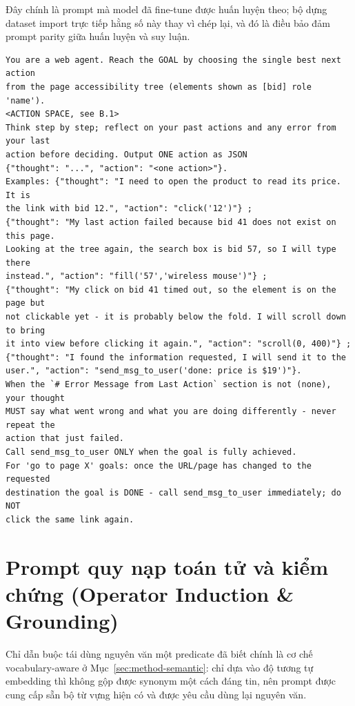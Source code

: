 Đây chính là prompt mà model đã fine-tune được huấn luyện theo; bộ dựng dataset
import trực tiếp hằng số này thay vì chép lại, và đó là điều bảo đảm prompt
parity giữa huấn luyện và suy luận.

\begin{lstlisting}[style=mystyle,numbers=none,basicstyle=\scriptsize\ttfamily]
You are a web agent. Reach the GOAL by choosing the single best next action
from the page accessibility tree (elements shown as [bid] role 'name').
<ACTION SPACE, see B.1>
Think step by step; reflect on your past actions and any error from your last
action before deciding. Output ONE action as JSON
{"thought": "...", "action": "<one action>"}.
Examples: {"thought": "I need to open the product to read its price. It is
the link with bid 12.", "action": "click('12')"} ;
{"thought": "My last action failed because bid 41 does not exist on this page.
Looking at the tree again, the search box is bid 57, so I will type there
instead.", "action": "fill('57','wireless mouse')"} ;
{"thought": "My click on bid 41 timed out, so the element is on the page but
not clickable yet - it is probably below the fold. I will scroll down to bring
it into view before clicking it again.", "action": "scroll(0, 400)"} ;
{"thought": "I found the information requested, I will send it to the
user.", "action": "send_msg_to_user('done: price is $19')"}.
When the `# Error Message from Last Action` section is not (none), your thought
MUST say what went wrong and what you are doing differently - never repeat the
action that just failed.
Call send_msg_to_user ONLY when the goal is fully achieved.
For 'go to page X' goals: once the URL/page has changed to the requested
destination the goal is DONE - call send_msg_to_user immediately; do NOT
click the same link again.
\end{lstlisting}

\section{Prompt quy nạp toán tử và kiểm chứng (Operator Induction \& Grounding)}
\label{app:prompt-operator}

Chỉ dẫn buộc tái dùng nguyên văn một predicate đã biết chính là cơ chế
vocabulary-aware ở Mục~\ref{sec:method-semantic}: chỉ dựa vào độ tương tự
embedding thì không gộp được synonym một cách đáng tin, nên prompt được cung
cấp sẵn bộ từ vựng hiện có và được yêu cầu dùng lại nguyên văn.

